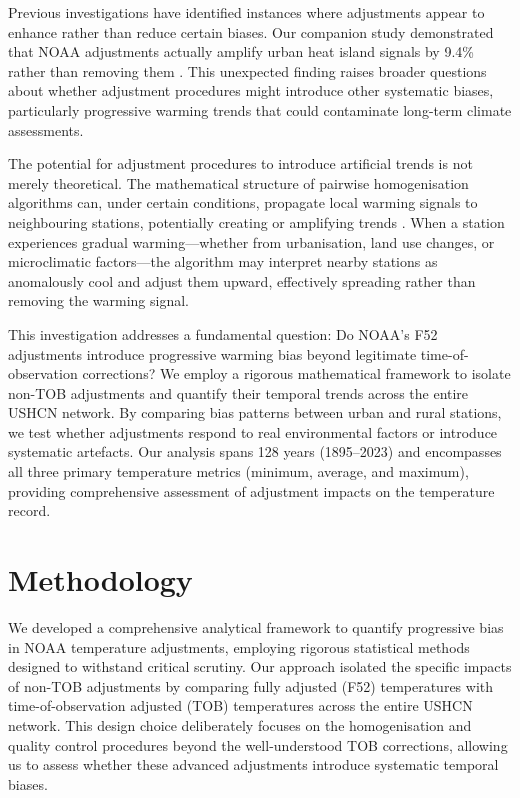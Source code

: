 \documentclass[11pt, a4paper]{article}
\begin{document}
Previous investigations have identified instances where adjustments appear to enhance rather than reduce certain biases. Our companion study demonstrated that NOAA adjustments actually amplify urban heat island signals by 9.4\% rather than removing them \parencite{lyon2025uhi}. This unexpected finding raises broader questions about whether adjustment procedures might introduce other systematic biases, particularly progressive warming trends that could contaminate long-term climate assessments.

The potential for adjustment procedures to introduce artificial trends is not merely theoretical. The mathematical structure of pairwise homogenisation algorithms can, under certain conditions, propagate local warming signals to neighbouring stations, potentially creating or amplifying trends \parencite{steirou2012investigation}. When a station experiences gradual warming—whether from urbanisation, land use changes, or microclimatic factors—the algorithm may interpret nearby stations as anomalously cool and adjust them upward, effectively spreading rather than removing the warming signal.

This investigation addresses a fundamental question: Do NOAA's F52 adjustments introduce progressive warming bias beyond legitimate time-of-observation corrections? We employ a rigorous mathematical framework to isolate non-TOB adjustments and quantify their temporal trends across the entire USHCN network. By comparing bias patterns between urban and rural stations, we test whether adjustments respond to real environmental factors or introduce systematic artefacts. Our analysis spans 128 years (1895–2023) and encompasses all three primary temperature metrics (minimum, average, and maximum), providing comprehensive assessment of adjustment impacts on the temperature record.

\section{Methodology}
\label{sec:methods}

We developed a comprehensive analytical framework to quantify progressive bias in NOAA temperature adjustments, employing rigorous statistical methods designed to withstand critical scrutiny. Our approach isolated the specific impacts of non-TOB adjustments by comparing fully adjusted (F52) temperatures with time-of-observation adjusted (TOB) temperatures across the entire USHCN network. This design choice deliberately focuses on the homogenisation and quality control procedures beyond the well-understood TOB corrections, allowing us to assess whether these advanced adjustments introduce systematic temporal biases.
\end{document}
